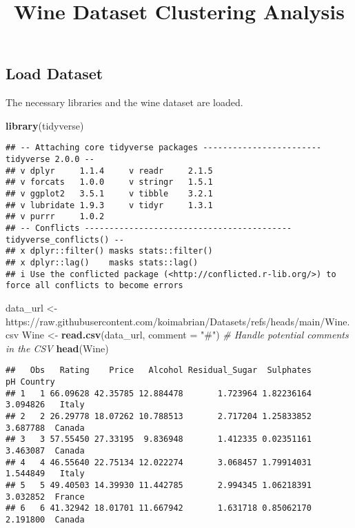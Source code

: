 \documentclass[
]{article}
\title{Wine Dataset Clustering Analysis}
\author{}
\date{\vspace{-2.5em}}
\newenvironment{Shaded}{\begin{snugshade}}{\end{snugshade}}
\newcommand{\AttributeTok}[1]{\textcolor[rgb]{0.13,0.29,0.53}{#1}}
\newcommand{\CommentTok}[1]{\textcolor[rgb]{0.56,0.35,0.01}{\textit{#1}}}
\newcommand{\FunctionTok}[1]{\textcolor[rgb]{0.13,0.29,0.53}{\textbf{#1}}}
\newcommand{\NormalTok}[1]{#1}
\newcommand{\OtherTok}[1]{\textcolor[rgb]{0.56,0.35,0.01}{#1}}
\newcommand{\StringTok}[1]{\textcolor[rgb]{0.31,0.60,0.02}{#1}}
\begin{document}
\maketitle

\subsection{Load Dataset}\label{load-dataset}

The necessary libraries and the wine dataset are loaded.

\begin{Shaded}
\begin{Highlighting}[]
\FunctionTok{library}\NormalTok{(tidyverse)}
\end{Highlighting}
\end{Shaded}

\begin{verbatim}
## -- Attaching core tidyverse packages ------------------------ tidyverse 2.0.0 --
## v dplyr     1.1.4     v readr     2.1.5
## v forcats   1.0.0     v stringr   1.5.1
## v ggplot2   3.5.1     v tibble    3.2.1
## v lubridate 1.9.3     v tidyr     1.3.1
## v purrr     1.0.2     
## -- Conflicts ------------------------------------------ tidyverse_conflicts() --
## x dplyr::filter() masks stats::filter()
## x dplyr::lag()    masks stats::lag()
## i Use the conflicted package (<http://conflicted.r-lib.org/>) to force all conflicts to become errors
\end{verbatim}

\begin{Shaded}
\begin{Highlighting}[]
\NormalTok{data\_url }\OtherTok{\textless{}{-}} \StringTok{\textquotesingle{}https://raw.githubusercontent.com/koimabrian/Datasets/refs/heads/main/Wine.csv\textquotesingle{}}
\NormalTok{Wine }\OtherTok{\textless{}{-}} \FunctionTok{read.csv}\NormalTok{(data\_url, }\AttributeTok{comment =} \StringTok{"\#"}\NormalTok{)  }\CommentTok{\# Handle potential comments in the CSV}
\FunctionTok{head}\NormalTok{(Wine)}
\end{Highlighting}
\end{Shaded}

\begin{verbatim}
##   Obs   Rating    Price   Alcohol Residual_Sugar  Sulphates       pH Country
## 1   1 66.09628 42.35785 12.884478       1.723964 1.82236164 3.094826   Italy
## 2   2 26.29778 18.07262 10.788513       2.717204 1.25833852 3.687788  Canada
## 3   3 57.55450 27.33195  9.836948       1.412335 0.02351161 3.463087  Canada
## 4   4 46.55640 22.75134 12.022274       3.068457 1.79914031 1.544849   Italy
## 5   5 49.40503 14.39930 11.442785       2.994345 1.06218391 3.032852  France
## 6   6 41.32942 18.01701 11.667942       1.631718 0.85062170 2.191800  Canada
\end{verbatim}
\end{document}
